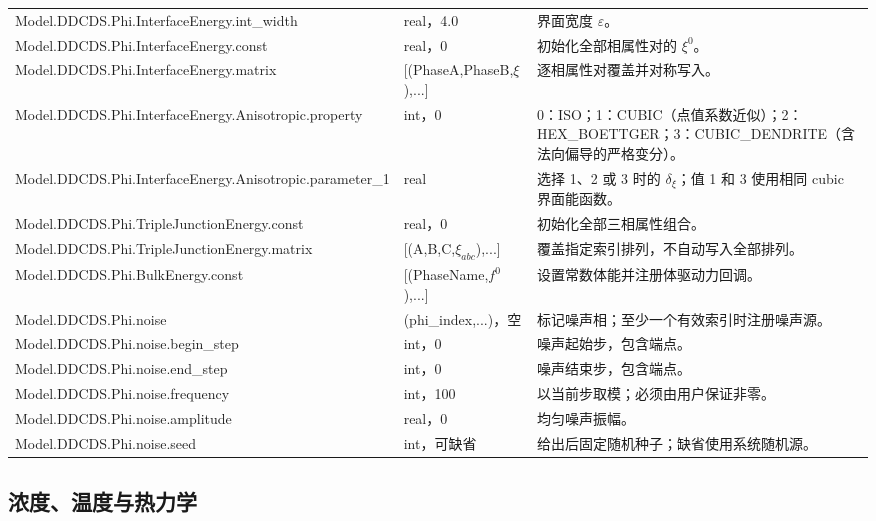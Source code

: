 \documentclass[UTF8,a4paper,11pt]{ctexart}
\begin{document}
\begin{longtable}{>{\ttfamily}p{}p{}p{}}
Model.DDCDS.Phi.InterfaceEnergy.int\_width & real，4.0 & 界面宽度 $\varepsilon$。\\
Model.DDCDS.Phi.InterfaceEnergy.const & real，0 & 初始化全部相属性对的 $\xi^0$。\\
Model.DDCDS.Phi.InterfaceEnergy.matrix & [(PhaseA,PhaseB,$\xi$),...] & 逐相属性对覆盖并对称写入。\\
Model.DDCDS.Phi.InterfaceEnergy.Anisotropic.property & int，0 & 0：ISO；1：CUBIC（点值系数近似）；2：HEX\_BOETTGER；3：CUBIC\_DENDRITE（含法向偏导的严格变分）。\\
Model.DDCDS.Phi.InterfaceEnergy.Anisotropic.parameter\_1 & real & 选择 1、2 或 3 时的 $\delta_\xi$；值 1 和 3 使用相同 cubic 界面能函数。\\
Model.DDCDS.Phi.TripleJunctionEnergy.const & real，0 & 初始化全部三相属性组合。\\
Model.DDCDS.Phi.TripleJunctionEnergy.matrix & [(A,B,C,$\xi_{abc}$),...] & 覆盖指定索引排列，不自动写入全部排列。\\
Model.DDCDS.Phi.BulkEnergy.const & [(PhaseName,$f^0$),...] & 设置常数体能并注册体驱动力回调。\\
Model.DDCDS.Phi.noise & (phi\_index,...)，空 & 标记噪声相；至少一个有效索引时注册噪声源。\\
Model.DDCDS.Phi.noise.begin\_step & int，0 & 噪声起始步，包含端点。\\
Model.DDCDS.Phi.noise.end\_step & int，0 & 噪声结束步，包含端点。\\
Model.DDCDS.Phi.noise.frequency & int，100 & 以当前步取模；必须由用户保证非零。\\
Model.DDCDS.Phi.noise.amplitude & real，0 & 均匀噪声振幅。\\
Model.DDCDS.Phi.noise.seed & int，可缺省 & 给出后固定随机种子；缺省使用系统随机源。\\
\bottomrule
\end{longtable}

\subsection{浓度、温度与热力学}
\end{document}
